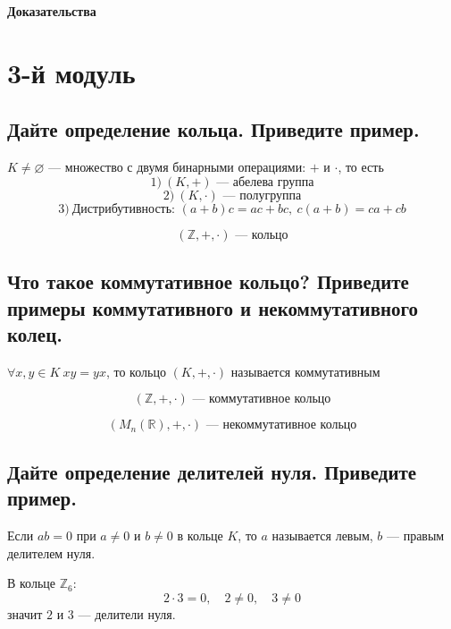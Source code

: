 \begin{center}
    {\Huge \textbf{Доказательства}}
\end{center}
\section{3-й модуль}

\subsection{Дайте определение кольца. Приведите пример.}

\begin{definition}
    $K \neq \varnothing$ --- множество с двумя бинарными операциями: $+$ и $\cdot$, то есть
    \[
        1)\ (K, +) \text{ --- абелева группа}
    \]
    \[
        2)\ (K, \cdot) \text{ --- полугруппа}
    \]
    \[
        3)\ \text{Дистрибутивность: } (a + b)c = ac + bc,\ c(a + b) = ca + cb
    \]
\end{definition}
\begin{example}
    \[
        (\mathbb{Z}, +, \cdot) \text{ --- кольцо}
    \]
\end{example}


\subsection{Что такое коммутативное кольцо? Приведите примеры коммутативного и некоммутативного колец.}

\begin{definition}
    $\forall x, y \in K\ xy = yx$, то кольцо $(K, +, \cdot)$ называется коммутативным
\end{definition}

\begin{example}
    \[
        (\mathbb{Z}, +, \cdot) \text{ --- коммутативное кольцо}
    \]
\end{example}

\begin{example}
    \[
        (M_n(\mathbb{R}), +, \cdot) \text{ --- некоммутативное кольцо}
    \]
\end{example}


\subsection{Дайте определение делителей нуля. Приведите пример.}

\begin{definition}
    Если $ab = 0$ при $a \neq 0$ и $b \neq 0$ в кольце $K$, то $a$ называется левым, $b$ --- правым делителем нуля.
\end{definition}
\begin{example}
    В кольце $\mathbb{Z}_6$:
    \[
        2 \cdot 3 = 0,\quad 2 \neq 0,\quad 3 \neq 0
    \]
    значит $2$ и $3$ --- делители нуля.
\end{example}



